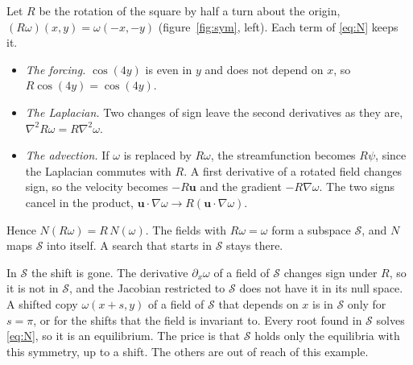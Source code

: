 \documentclass[11pt,a4paper]{article}
\newcommand{\om}{\omega}
\begin{document}
Let $R$ be the rotation of the square by half a turn about the origin, $(R\om)(x, y) = \om(-x, -y)$ (figure~\ref{fig:sym}, left). Each term of \eqref{eq:N} keeps it.
\begin{itemize}\setlength{\itemsep}{1pt}
\item \emph{The forcing.} $\cos(4y)$ is even in $y$ and does not depend on $x$, so $R\cos(4y) = \cos(4y)$.
\item \emph{The Laplacian.} Two changes of sign leave the second derivatives as they are, $\nabla^2 R\om = R\nabla^2\om$.
\item \emph{The advection.} If $\om$ is replaced by $R\om$, the streamfunction becomes $R\psi$, since the Laplacian commutes with $R$. A first derivative of a rotated field changes sign, so the velocity becomes $-R\mathbf u$ and the gradient $-R\nabla\om$. The two signs cancel in the product, $\mathbf u\cdot\nabla\om \to R(\mathbf u\cdot\nabla\om)$.
\end{itemize}
Hence $N(R\om) = R\,N(\om)$. The fields with $R\om = \om$ form a subspace $\mathcal S$, and $N$ maps $\mathcal S$ into itself. A search that starts in $\mathcal S$ stays there.

In $\mathcal S$ the shift is gone. The derivative $\partial_x\om$ of a field of $\mathcal S$ changes sign under $R$, so it is not in $\mathcal S$, and the Jacobian restricted to $\mathcal S$ does not have it in its null space. A shifted copy $\om(x + s, y)$ of a field of $\mathcal S$ that depends on $x$ is in $\mathcal S$ only for $s = \pi$, or for the shifts that the field is invariant to. Every root found in $\mathcal S$ solves \eqref{eq:N}, so it is an equilibrium. The price is that $\mathcal S$ holds only the equilibria with this symmetry, up to a shift. The others are out of reach of this example.
\end{document}
